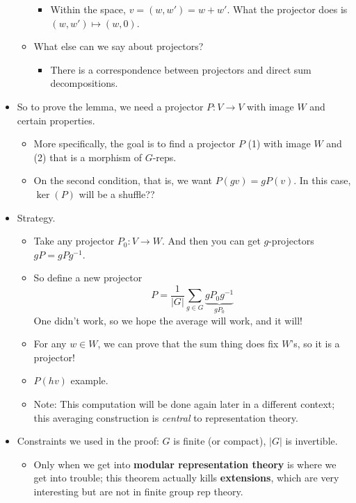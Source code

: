 \documentclass[../notes.tex]{subfiles}
\begin{document}
\begin{itemize}
\begin{itemize}
\begin{itemize}
            \item Within the space, $v=(w,w')=w+w'$. What the projector does is $(w,w')\mapsto(w,0)$.
        \end{itemize}
        \item What else can we say about projectors?
        \begin{itemize}
            \item There is a correspondence between projectors and direct sum decompositions.
        \end{itemize}
    \end{itemize}
    \item So to prove the lemma, we need a projector $P:V\to V$ with image $W$ and certain properties.
    \begin{itemize}
        \item More specifically, the goal is to find a projector $P$ (1) with image $W$ and (2) that is a morphism of $G$-reps.
        \item On the second condition, that is, we want $P(gv)=gP(v)$. In this case, $\ker(P)$ will be a shuffle??
    \end{itemize}
    \item Strategy.
    \begin{itemize}
        \item Take any projector $P_0:V\to W$. And then you can get $g$-projectors $gP=gPg^{-1}$.
        \item So define a new projector
        \begin{equation*}
            P = \frac{1}{|G|}\sum_{g\in G}\underbrace{gP_0g^{-1}}_{gP_0}
        \end{equation*}
        One didn't work, so we hope the average will work, and it will!
        \item For any $w\in W$, we can prove that the sum thing does fix $W$'s, so it is a projector!
        \item $P(hv)$ example.
        \item Note: This computation will be done again later in a different context; this averaging construction is \emph{central} to representation theory.
    \end{itemize}
    \item Constraints we used in the proof: $G$ is finite (or compact), $|G|$ is invertible.
    \begin{itemize}
        \item Only when we get into \textbf{modular representation theory} is where we get into trouble; this theorem actually kills \textbf{extensions}, which are very interesting but are not in finite group rep theory.

\end{itemize}
\end{itemize}
\end{document}

